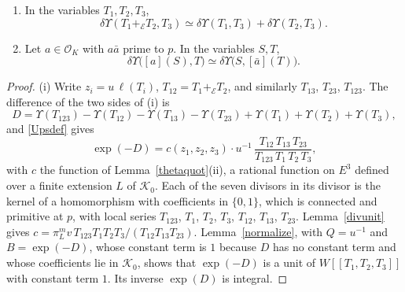 \begin{proposition}\label{cubeadj}
\begin{enumerate}
\item[(i)] In the variables $T_1,T_2,T_3$,
\[
\delta\Upsilon(T_1+_{\mathcal E}T_2,T_3)\simeq\delta\Upsilon(T_1,T_3)+\delta\Upsilon(T_2,T_3).
\]
\item[(ii)] Let $a\in\mathcal O_K$ with $a\bar a$ prime to $p$. In the variables $S,T$,
\[
\delta\Upsilon\big([a](S),T\big)\simeq\delta\Upsilon\big(S,[\bar a](T)\big).
\]
\end{enumerate}
\end{proposition}

\begin{proof}
(i) Write $z_i=u\,\ell(T_i)$, $T_{12}=T_1+_{\mathcal E}T_2$, and similarly $T_{13}$, $T_{23}$, $T_{123}$. The difference of the two sides of (i) is
\[
D=\Upsilon(T_{123})-\Upsilon(T_{12})-\Upsilon(T_{13})-\Upsilon(T_{23})+\Upsilon(T_1)+\Upsilon(T_2)+\Upsilon(T_3),
\]
and \eqref{Upsdef} gives
\[
\exp(-D)=c(z_1,z_2,z_3)\cdot u^{-1}\,\frac{T_{12}\,T_{13}\,T_{23}}{T_{123}\,T_1\,T_2\,T_3},
\]
with $c$ the function of Lemma~\ref{thetaquot}(ii), a rational function on $E^3$ defined over a finite extension $L$ of $\mathcal K_0$. Each of the seven divisors in its divisor is the kernel of a homomorphism with coefficients in $\{0,1\}$, which is connected and primitive at $p$, with local series $T_{123}$, $T_1$, $T_2$, $T_3$, $T_{12}$, $T_{13}$, $T_{23}$. Lemma~\ref{divunit} gives $c=\pi_L^mv\,T_{123}T_1T_2T_3/(T_{12}T_{13}T_{23})$. Lemma~\ref{normalize}, with $Q=u^{-1}$ and $B=\exp(-D)$, whose constant term is $1$ because $D$ has no constant term and whose coefficients lie in $\mathcal K_0$, shows that $\exp(-D)$ is a unit of $W[[T_1,T_2,T_3]]$ with constant term $1$. Its inverse $\exp(D)$ is integral.


\end{proof}
